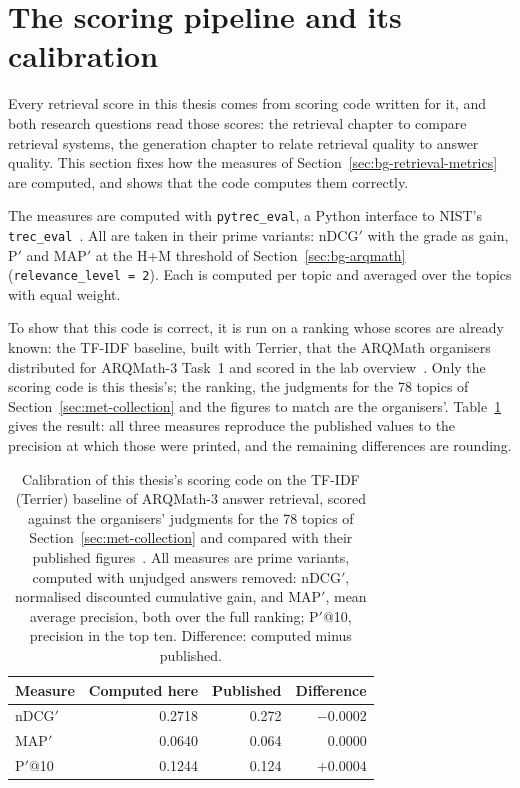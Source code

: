 \section{The scoring pipeline and its calibration}\label{sec:met-calibration}

Every retrieval score in this thesis comes from scoring code written for it, and
both research questions read those scores: the retrieval chapter to compare
retrieval systems, the generation chapter to relate retrieval quality to
answer quality. This section fixes how the measures of
Section~\ref{sec:bg-retrieval-metrics} are computed, and shows
that the code computes them correctly.

The measures are computed with \texttt{pytrec\_eval}, a Python interface to NIST's
\texttt{trec\_eval}~\cite{vangysel2018pytreceval}. All are taken in their prime
variants: nDCG$'$ with the grade as gain, P$'$ and MAP$'$ at the H+M threshold of
Section~\ref{sec:bg-arqmath} (\texttt{relevance\_level = 2}). Each is computed per
topic and averaged over the topics with equal weight.

To show that this code is correct, it is run on a ranking whose scores are already
known: the TF-IDF baseline, built with Terrier, that the ARQMath organisers
distributed for ARQMath-3 Task~1 and scored in the lab
overview~\cite{mansouri2022arqmath3}. Only the scoring code is this thesis's; the
ranking, the judgments for the 78 topics of Section~\ref{sec:met-collection} and
the figures to match are the organisers'. Table~\ref{tab:met-calibration} gives the
result: all three measures reproduce the published values to the precision at
which those were printed, and the remaining differences are rounding.

\begin{table}[t]
\centering
\begin{tabular}{lrrr}
\toprule
Measure & Computed here & Published & Difference \\
\midrule
nDCG$'$   & 0.2718 & 0.272 & $-0.0002$ \\
MAP$'$    & 0.0640 & 0.064 & $\phantom{-}0.0000$ \\
P$'$@10   & 0.1244 & 0.124 & $+0.0004$ \\
\bottomrule
\end{tabular}
\caption[Calibration of the scoring code]{Calibration of this thesis's scoring code on the TF-IDF (Terrier) baseline
of ARQMath-3 answer retrieval, scored against the organisers' judgments for the 78 topics of
Section~\ref{sec:met-collection} and compared with their published
figures~\cite[Table~3]{mansouri2022arqmath3}. All measures are prime variants,
computed with unjudged answers removed: nDCG$'$, normalised discounted cumulative
gain, and MAP$'$, mean average precision, both over the full ranking; P$'$@10,
precision in the top ten. Difference: computed minus published.}
\label{tab:met-calibration}
\end{table}


